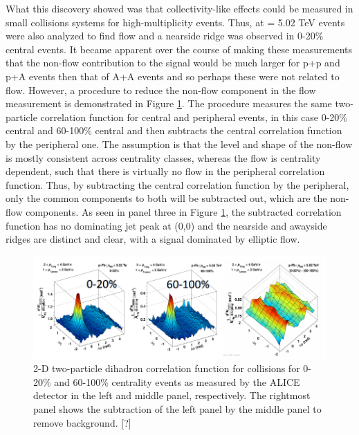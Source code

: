 What this discovery showed was that collectivity-like effects could be measured in small collisions systems for high-multiplicity events. Thus, \ppb at \sqsn = 5.02 TeV events were also analyzed to find flow and a nearside ridge was observed in 0-20\% central events. It became apparent over the course of making these measurements that the non-flow contribution to the signal would be much larger for p+p and p+A events then that of A+A events and so perhaps these were not related to flow. However, a procedure to reduce the non-flow component in the flow measurement is demonstrated in Figure \ref{fig:pPb_ridge_subtraction}. The procedure measures the same two-particle correlation function for central and peripheral events, in this case 0-20\% central and 60-100\% central and then subtracts the central correlation function by the peripheral one. The assumption is that the level and shape of the non-flow is mostly consistent across centrality classes, whereas the flow is centrality dependent, such that there is virtually no flow in the peripheral correlation function. Thus, by subtracting the central correlation function by the peripheral, only the common components to both will be subtracted out, which are the non-flow components. As seen in panel three in Figure \ref{fig:pPb_ridge_subtraction}, the subtracted correlation function has no dominating jet peak at (0,0) and the nearside and awayside ridges are distinct and clear, with a signal dominated by elliptic flow.

\begin{figure}[h!]
\begin{center}
\includegraphics[width=0.85\linewidth]{figs/pPb_subtraction_correlation.PNG}
\caption{ 2-D two-particle dihadron correlation function for \ppb collisions for 0-20\% and 60-100\% centrality events as measured by the ALICE detector in the left and middle panel, respectively. The rightmost panel shows the subtraction of the left panel by the middle panel to remove background. [?]}
\label{fig:pPb_ridge_subtraction}
\end{center}
\end{figure}

